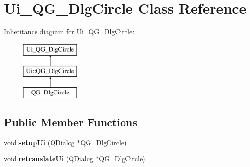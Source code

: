 \hypertarget{classUi__QG__DlgCircle}{\section{Ui\-\_\-\-Q\-G\-\_\-\-Dlg\-Circle Class Reference}
\label{classUi__QG__DlgCircle}
}
Inheritance diagram for Ui\-\_\-\-Q\-G\-\_\-\-Dlg\-Circle\-:\begin{figure}[H]
\begin{center}
\leavevmode
\includegraphics[height=3.000000cm]{classUi__QG__DlgCircle}
\end{center}
\end{figure}
\subsection*{Public Member Functions}
\begin{DoxyCompactItemize}
\item 
\hypertarget{classUi__QG__DlgCircle_ad8f4e0be70fead8c88d7e6b5a916a360}{void {\bfseries setup\-Ui} (Q\-Dialog $\ast$\hyperlink{classQG__DlgCircle}{Q\-G\-\_\-\-Dlg\-Circle})}\label{classUi__QG__DlgCircle_ad8f4e0be70fead8c88d7e6b5a916a360}

\item 
\hypertarget{classUi__QG__DlgCircle_a60ec75ffbb1ac4a62e72d06d5ca51173}{void {\bfseries retranslate\-Ui} (Q\-Dialog $\ast$\hyperlink{classQG__DlgCircle}{Q\-G\-\_\-\-Dlg\-Circle})}\label{classUi__QG__DlgCircle_a60ec75ffbb1ac4a62e72d06d5ca51173}

\end{DoxyCompactItemize}
